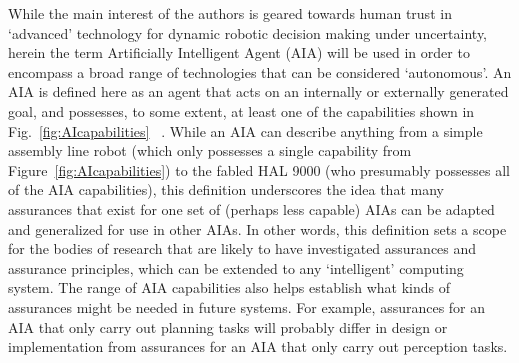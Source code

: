 
    While the main interest of the authors is geared towards human trust in `advanced' technology for dynamic robotic decision making under uncertainty, herein the term Artificially Intelligent Agent (AIA) will be used in order to encompass a broad range of technologies that can be considered `autonomous'.
    An AIA is defined here as an agent that acts on an internally or externally generated goal, and possesses, to some extent, at least one of the capabilities shown in Fig.~\ref{fig:AIcapabilities} ~\cite{Russell2010-wv,Nilsson2009-rp,Luger2008-vf}. 
    While an AIA can describe anything from a simple assembly line robot (which only possesses a single capability from Figure~\ref{fig:AIcapabilities}) to the fabled HAL 9000 (who presumably possesses all of the AIA capabilities), this definition underscores the idea that many assurances that exist for one set of (perhaps less capable) AIAs can be adapted and generalized for use in other AIAs.
    In other words, this definition sets a scope for the bodies of research that are likely to have investigated assurances and assurance principles, which can be extended to any `intelligent' computing system. 
    The range of AIA capabilities also helps establish what kinds of assurances might be needed in future systems. 
    For example, assurances for an AIA that only carry out planning tasks will probably differ in design or implementation from assurances for an AIA that only carry out perception tasks. 
    
    
